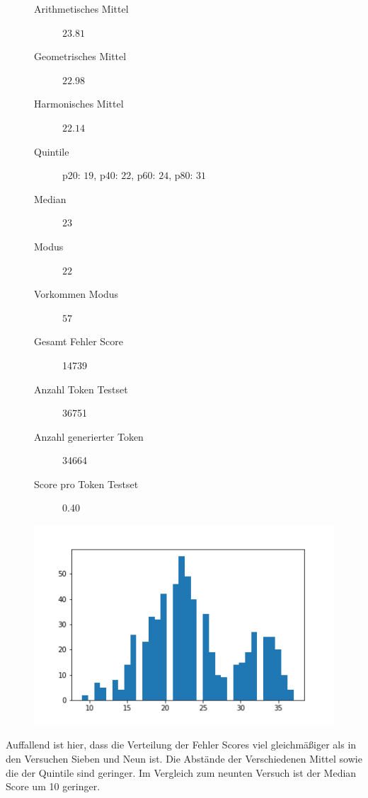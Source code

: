 \documentclass[pdftex,a4paper,halfparskip, article]{scrartcl}
\begin{document}
\begin{figure}
\centering
\begin{minipage}{.5\textwidth}
  \centering
  \begin{description}
	\item[Arithmetisches Mittel] $23.81$	
	\item[Geometrisches Mittel] $22.98$
	\item[Harmonisches Mittel] $22.14$
	\item[Quintile] p20: $19$, p40: $22$, p60: $24$, p80: $31$
	\item[Median] $23$
	\item[Modus] $22$
	\item[Vorkommen Modus] $57$
	\item[Gesamt Fehler Score] 14739
	\item[Anzahl Token Testset] 36751 
	\item[Anzahl generierter Token] 34664
	\item[Score pro Token Testset]  0.40
\end{description}
  \label{fig:lage_bin13}
\end{minipage}%
\begin{minipage}{.5\textwidth}
  \centering
  \includegraphics[width=1\linewidth]{predictions_bin13_histogramm}
  \label{fig:hist_bin13}
\end{minipage}
\end{figure}

Auffallend ist hier, dass die Verteilung der Fehler Scores viel gleichmäßiger als in den Versuchen Sieben und Neun ist. Die Abstände der Verschiedenen Mittel sowie die der Quintile sind geringer. Im Vergleich zum neunten Versuch ist der Median Score um 10 geringer. 
\end{document}
